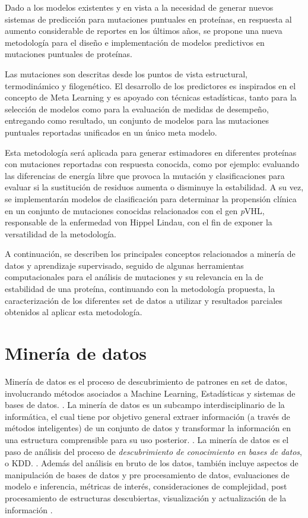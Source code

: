 Dado a los modelos existentes y en vista a la necesidad de generar nuevos sistemas de predicción para mutaciones puntuales en proteínas, en respuesta al aumento considerable de reportes en los últimos años, se propone una nueva metodología para el diseño e implementación de modelos predictivos en mutaciones puntuales de proteínas.

Las mutaciones son descritas desde los puntos de vista estructural, termodinámico y filogenético. El desarrollo de los predictores es inspirados en el concepto de Meta Learning y es apoyado con técnicas estadísticas, tanto para la selección de modelos como para la evaluación de medidas de desempeño, entregando como resultado, un conjunto de modelos para las mutaciones puntuales reportadas unificados en un único meta modelo.

Esta metodología será aplicada para generar estimadores en diferentes proteínas con mutaciones reportadas con respuesta conocida, como por ejemplo: evaluando las diferencias de energía libre que provoca la mutación y clasificaciones para evaluar si la sustitución de residuos aumenta o disminuye la estabilidad. A su vez, se implementarán modelos de clasificación para determinar la propensión clínica en un conjunto de mutaciones conocidas relacionados con el gen \textit{p}VHL, responsable de la enfermedad von Hippel Lindau, con el fin de exponer la versatilidad de la metodología.

A continuación, se describen los principales conceptos relacionados a minería de datos y aprendizaje supervisado, seguido de algunas herramientas computacionales para el análisis de mutaciones y su relevancia en la de estabilidad de una proteína, continuando con la metodología propuesta, la caracterización de los diferentes set de datos a utilizar y resultados parciales obtenidos al aplicar esta metodología.

\section{Minería de datos}


Minería de datos es el proceso de descubrimiento de patrones en set de datos, involucrando métodos asociados a Machine Learning, Estadísticas y sistemas de bases de datos. \cite{hand2006data}. La minería de datos es un subcampo interdisciplinario de la informática, el cual tiene por objetivo general extraer información (a través de métodos inteligentes) de un conjunto de datos y transformar la información en una estructura comprensible para su uso posterior. \cite{fayyad1996knowledge, dunham2006data}. La minería de datos es el paso de análisis del proceso de \textit{descubrimiento de conocimiento en bases de datos}, o KDD. \cite{fayyad1996kdd}. Además del análisis en bruto de los datos, también incluye aspectos de manipulación de bases de datos y pre procesamiento de datos, evaluaciones de modelo e inferencia, métricas de interés, consideraciones de complejidad, post procesamiento de estructuras descubiertas, visualización y actualización de la información \cite{berry2004data}.

